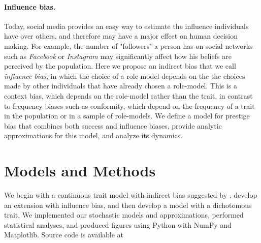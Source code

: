 \documentclass[12pt]{extarticle}
\begin{document}
\paragraph{Influence bias.}
Today, social media provides an easy way to estimate the influence individuals have over others, and therefore may have a major effect on human decision making. For example, the number of "followers" a person has on social networks such as \textit{Facebook} or \textit{Instagram} may significantly affect how his beliefs are perceived by the population. %
Here we propose an indirect bias that we call \textit{influence bias}, in which the choice of a role-model depends on the the choices made by other individuals that have already chosen a role-model. 
This is a context bias, %
 which depends on the role-model rather than the trait, in contrast to frequency biases such as conformity, which depend on the frequency of a trait in the population or in a sample of role-models. 
We define a model for prestige bias that combines both success and influence biases, provide analytic approximations for this model, and analyze its dynamics.
 
\section*{Models and Methods}


We begin with a continuous trait model with indirect bias suggested by \citet{evolutionBook}, develop an extension with influence bias, and then develop a model with a dichotomous trait.
We implemented our stochastic models and approximations, performed statistical analyses, and produced figures using Python with NumPy and Matplotlib. %
Source code is available at %
\end{document}
